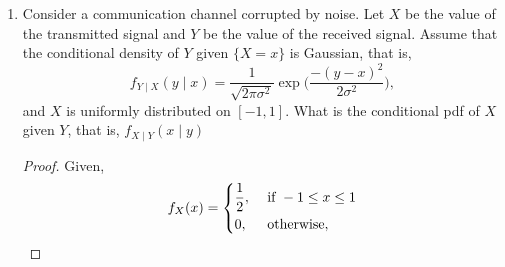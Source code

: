 \documentclass[paper=usletter, fontsize=12pt]{article}
\begin{document}
\begin{enumerate}
\begin{enumerate}
\begin{proof}
\begin{equation*}
                    =\begin{dcases}
                        \frac{1}{1600}(40-3m), & \text{ if } t > 0,\\
                        \frac{1}{1600}(m-40), & \text{otherwise}
                    \end{dcases}
                \end{equation*}
                \endgroup
                And the expected value,
                \begin{align*}
                    &= \frac{1}{1600}\bigg(\int_{0}^{40}(40-3m)m\diff{m}+\int_{-40}^{0}(m-40)m\diff{m}\bigg)\\
                    & = \frac{1}{1600}\bigg((20m^2-m^3)\bigg\vert_{0}^{40}+(\frac{m^3}{3}-20m^3)\bigg\vert_{-40}^{0}\bigg)\\
                    & = \frac{1}{1600}\bigg(-32000+ \frac{160000}{3}\bigg)\\
                    & = \frac{40}{3} \qedhere
                \end{align*}
                \endgroup

            \end{proof}

        \end{enumerate}

        \item Consider a communication channel corrupted by noise. Let $X$ be
        the value of the transmitted signal and $Y$ be the value of the
        received signal. Assume that the conditional density of $Y$ given
        $\{X=x\}$ is Gaussian, that is,
        \begin{equation*}
            f_{Y \mid X}(y \mid x) = \frac{1}{\sqrt{2\pi\sigma^2}}\exp\bigg(\frac{-(y-x)^2}{2\sigma^2}\bigg),
        \end{equation*}
        and $X$ is uniformly distributed on $[-1,1]$. What is the conditional
        pdf of $X$ given $Y$, that is, $f_{X \mid Y}(x \mid y)$
        \begin{proof}

            Given,
            \begin{equation*}
                f_{X}(x) =
                \begin{dcases}
                    \frac{1}{2}, & \text{ if } -1 \le x \le 1\\
                    0, & \text{ otherwise},
                \end{dcases}
            \end{equation*}


\end{proof}
\end{enumerate}
\end{document}

